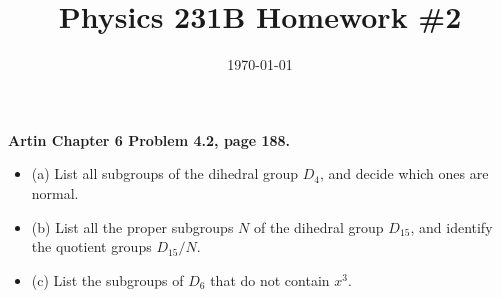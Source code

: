 \documentclass{article}
\date{\today}
\title{Physics 231B Homework \#2}
\begin{document}
\maketitle

\bigskip
\begin{prob}
    \textbf{Artin Chapter 6 Problem 4.2, page 188.}
    \begin{itemize}
        \item (a) List all subgroups of the dihedral group $D_4$, and decide which ones are normal.
        \item (b) List all the proper subgroups $N$ of the dihedral group $D_{15}$, and identify the quotient groups $D_{15}/N$.
        \item (c) List the subgroups of $D_6$ that do not contain $x^3$.
    \end{itemize}
\end{prob}
\end{document}
